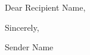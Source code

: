 \documentclass[letterpaper, 10pt, draft]{article}
\begin{document}
Dear Recipient Name,

\blindtext

\blindtext

Sincerely,

\vspace{2 \parskip}

Sender Name
\end{document}
